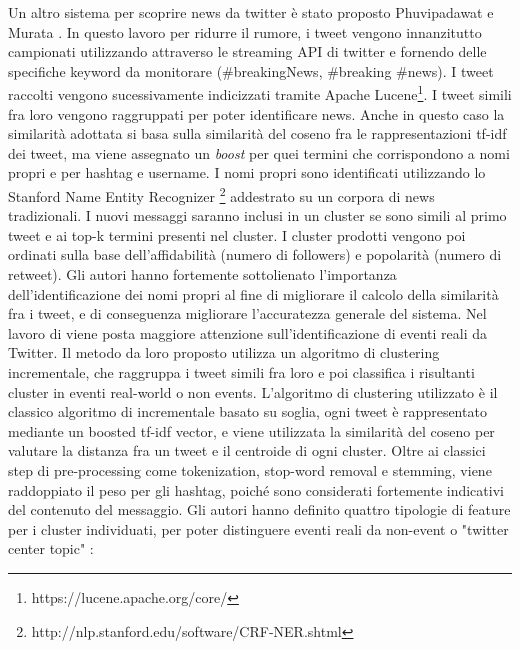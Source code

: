 Un altro sistema per scoprire news da twitter è stato proposto Phuvipadawat e Murata \cite{Phuvipadawat:2010:BND:1913791.1913911}. In questo lavoro per ridurre il rumore, i tweet vengono innanzitutto campionati utilizzando attraverso le  streaming API di twitter e fornendo delle specifiche keyword da monitorare (\#breakingNews, \#breaking \#news). I tweet raccolti vengono sucessivamente indicizzati tramite Apache Lucene\footnote{https://lucene.apache.org/core/}. I tweet simili fra loro vengono raggruppati per poter identificare news. Anche in questo caso la similarità adottata si basa sulla similarità del coseno fra le rappresentazioni tf-idf dei tweet, ma viene assegnato un \emph{boost} per quei termini che corrispondono a nomi propri e per hashtag e username. I nomi propri sono identificati utilizzando lo Stanford Name Entity Recognizer \footnote{http://nlp.stanford.edu/software/CRF-NER.shtml} addestrato su un corpora di news tradizionali.
 I nuovi messaggi saranno inclusi in un cluster se sono simili al primo tweet   e ai top-k termini  presenti nel cluster. I cluster prodotti vengono poi ordinati sulla base 
dell'affidabilità (numero di followers) e popolarità (numero di retweet).
Gli autori hanno fortemente sottolienato l'importanza dell'identificazione dei nomi propri al fine di migliorare il calcolo della similarità fra i tweet, e di conseguenza migliorare l'accuratezza generale del sistema.
Nel lavoro di \cite{DBLP:conf/icwsm/BeckerNG11} viene posta maggiore attenzione sull'identificazione di eventi reali da Twitter. Il metodo da loro proposto utilizza un algoritmo di clustering incrementale, che raggruppa i tweet simili fra loro e poi classifica i risultanti cluster in eventi real-world o non events. L'algoritmo di clustering utilizzato è il classico algoritmo di incrementale basato su soglia, ogni tweet è rappresentato mediante un boosted tf-idf vector, e viene utilizzata la similarità del coseno per valutare la distanza fra un tweet e il centroide di ogni cluster. Oltre ai classici step di pre-processing come tokenization, stop-word removal e stemming, viene raddoppiato il peso per gli hashtag, poiché sono considerati fortemente indicativi del contenuto del messaggio. Gli autori hanno definito quattro tipologie di feature per i cluster individuati, per poter distinguere eventi reali  da non-event o "twitter center topic" :
